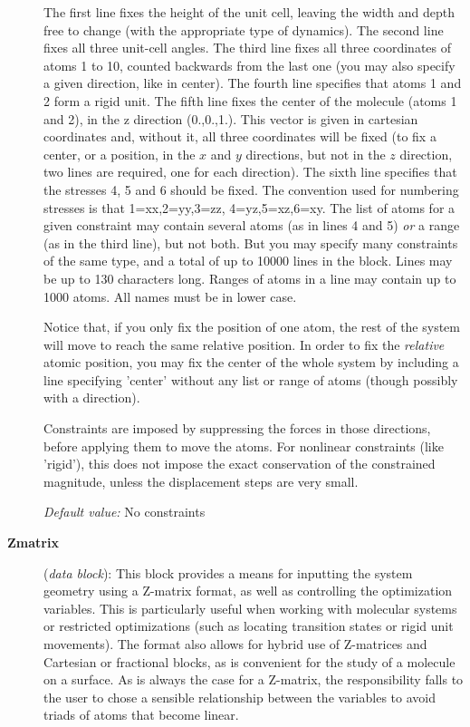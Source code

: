 \documentclass[11pt]{article}
\begin{document}
\begin{description}
The first line fixes the height of the unit cell, leaving the width
and depth free to change (with the appropriate type of dynamics).  The
second line fixes all three unit-cell angles.  The third line fixes
all three coordinates of atoms 1 to 10, counted backwards from the
last one (you may also specify a given direction, like in center).
The fourth line specifies that atoms 1 and 2 form a rigid unit.  The
fifth line fixes the center of the molecule (atoms 1 and 2), in the z
direction (0.,0.,1.). This vector is given in cartesian coordinates
and, without it, all three coordinates will be fixed (to fix a center,
or a position, in the $x$ and $y$ directions, but not in the $z$
direction, two lines are required, one for each direction).  The sixth
line specifies that the stresses 4, 5 and 6 should be fixed.  The
convention used for numbering stresses is that 1=xx,2=yy,3=zz,
4=yz,5=xz,6=xy.  The list of atoms for a given constraint may contain
several atoms (as in lines 4 and 5) {\it or} a range (as in the third
line), but not both. But you may specify many constraints of the same
type, and a total of up to 10000 lines in the block.  Lines may be up
to 130 characters long. Ranges of atoms in a line may contain up to
1000 atoms. All names must be in lower case.

Notice that, if you only fix the position of one atom, the rest of the
system will move to reach the same relative position. In order to
fix the {\it relative} atomic position, you may fix the center of
the whole system by including a line specifying 'center'
without any list or range of atoms (though possibly with a direction).

Constraints are imposed by suppressing the forces in those directions,
before applying them to move the atoms. For nonlinear constraints
(like 'rigid'), this does not impose the exact conservation of the 
constrained magnitude, unless the displacement steps are very small.

{\it Default value:} No constraints

\item[{\bf Zmatrix}] ({\it data block}): 
This block provides a means for inputting the system geometry using a Z-matrix
format, as well as controlling the optimization variables. This is particularly
useful when working with molecular systems or restricted optimizations (such
as locating transition states or rigid unit movements). The format also
allows for hybrid use of Z-matrices and Cartesian or fractional blocks, as
is convenient for the study of a molecule on a surface.
As is always the case for a Z-matrix, the responsibility falls to the user to
chose a sensible relationship between the variables to avoid triads of atoms
that become linear. 


\end{description}
\end{document}
